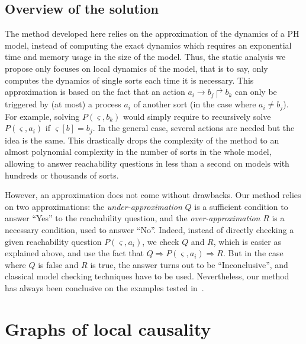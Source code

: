 \documentclass{movep}
\newcommand{\PHfrappeA}{\rightarrow}
\newcommand{\PHfrappeB}{\Rsh}
\newcommand{\PHfrappe}[3]{#1\PHfrappeA#2\PHfrappeB#3}
\def\ctx{\varsigma}
\newcommand{\Pcai}{P(\ctx, a_i)}
\def\PHget#1#2{{#1[#2]}}
\def\ctx{\varsigma}
\newcounter{la}
\begin{document}
\subsection{Overview of the solution}

The method developed here relies on the approximation of the dynamics of a PH model,
instead of computing the exact dynamics which requires an exponential time and memory usage
in the size of the model.
Thus, the static analysis we propose
only focuses on local dynamics of the model, that is to say, only computes the dynamics of
single sorts each time it is necessary.
This approximation is based on the fact that an action $\PHfrappe{a_i}{b_j}{b_k}$
can only be triggered by (at most) a process $a_i$ of another sort (in the case where $a_i \neq b_j$).
For example, solving $P(\ctx, b_k)$ would simply require to recursively solve $P(\ctx, a_i)$
if $\PHget{\ctx}{b} = {b_j}$.
In the general case, several actions are needed but the idea is the same.
This drastically drops the complexity of the method %
to an almost polynomial complexity in the number of sorts in the whole model,
allowing to answer reachability questions in less than a second
on models with hundreds or thousands of sorts.

However, an approximation does not come without drawbacks.
Our method relies on two approximations:
the \emph{under-approximation} $Q$ is a sufficient condition
to answer “Yes” to the reachability question,
and the \emph{over-approximation} $R$ is a necessary condition, used to answer “No”.
Indeed, instead of directly checking a given reachability question $\Pcai$,
we check $Q$ and $R$, which is easier as explained above,
and use the fact that $Q \Rightarrow \Pcai \Rightarrow R$.
But in the case where $Q$ is false and $R$ is true,
the answer turns out to be “Inconclusive”,
and classical model checking techniques have to be used.
Nevertheless, our method has always been conclusive on the examples tested in~\cite{PMR12-MSCS}.



\section{Graphs of local causality}
\label{sec:glc}
\end{document}
